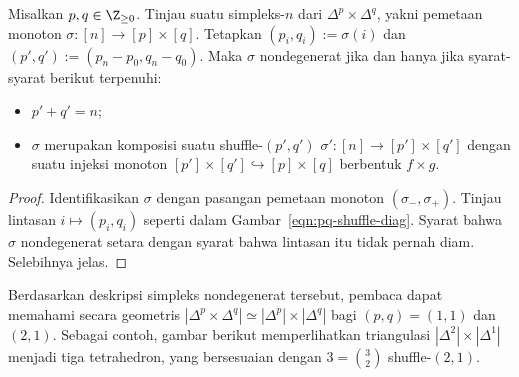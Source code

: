 \begin{proposition}
	Misalkan $p,q\in\Z_{\geq0}$. Tinjau suatu simpleks-$n$ dari
	$\Delta^p\times\Delta^q$, yakni pemetaan monoton
	$\sigma:[n]\to[p]\times[q]$. Tetapkan
	$(p_i,q_i):=\sigma(i)$ dan
	$(p',q'):=(p_n-p_0,q_n-q_0)$. Maka $\sigma$ nondegenerat jika dan hanya
	jika syarat-syarat berikut terpenuhi:
	\begin{itemize}
		\item $p'+q'=n$;
		\item $\sigma$ merupakan komposisi suatu shuffle-$(p',q')$
		$\sigma':[n]\to[p']\times[q']$ dengan suatu injeksi monoton
		$[p']\times[q']\hookrightarrow[p]\times[q]$ berbentuk $f\times g$.
	\end{itemize}
\end{proposition}
\begin{proof}
	Identifikasikan $\sigma$ dengan pasangan pemetaan monoton
	$(\sigma_-,\sigma_+)$. Tinjau lintasan $i\mapsto(p_i,q_i)$ seperti dalam
	Gambar~\eqref{eqn:pq-shuffle-diag}. Syarat bahwa $\sigma$ nondegenerat
	setara dengan syarat bahwa lintasan itu tidak pernah diam. Selebihnya
	jelas.
\end{proof}

Berdasarkan deskripsi simpleks nondegenerat tersebut, pembaca dapat
memahami secara geometris
$|\Delta^p\times\Delta^q|\simeq|\Delta^p|\times|\Delta^q|$ bagi
$(p,q)=(1,1)$ dan $(2,1)$. Sebagai contoh, gambar berikut memperlihatkan
triangulasi $|\Delta^2|\times|\Delta^1|$ menjadi tiga tetrahedron, yang
bersesuaian dengan $3=\binom{3}{2}$ shuffle-$(2,1)$.

